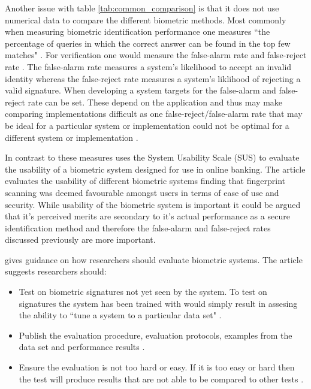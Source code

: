 \documentclass[12pt]{article}
\begin{document}
	Another issue with table \ref{tab:common_comparison} is that it does not use numerical data to compare the different biometric methods. Most commonly when measuring biometric identification performance one measures ``the percentage of queries in which the correct answer can be found in the top few matches" \citep{phillips_evaluating_biometric_systems2000}. For verification one would measure the false-alarm rate and false-reject rate \citep{phillips_evaluating_biometric_systems2000}. The false-alarm rate measures a system's likelihood to accept an invalid identity whereas the false-reject rate measures a system's liklihood of rejecting a valid signature. When developing a system targets for the false-alarm and false-reject rate can be set. These depend on the application and thus may make comparing implementations difficult as one false-reject/false-alarm rate that may be ideal for a particular system or implementation could not be optimal for a different system or implementation \citep{phillips_evaluating_biometric_systems2000}. 
	
	In contrast to these measures \cite{TASSABEHJ_Evaluating_biometrics_for_online_banking2012} uses the System Usability Scale (SUS) \citep{brooke1996sus} to evaluate the usability of a biometric system designed for use in online banking. The article evaluates the usability of different biometric systems finding that fingerprint scanning was deemed favourable amongst users in terms of ease of use and security. While usability of the biometric system is important it could be argued that it's perceived merits are secondary to it's actual performance as a secure identification method and therefore the false-alarm and false-reject rates discussed previously are more important.
	
	\cite{phillips_evaluating_biometric_systems2000} gives guidance on how researchers should evaluate biometric systems. The article suggests researchers should:
	\begin{itemize}
	    \item Test on biometric signatures not yet seen by the system. To test on signatures the system has been trained with would simply result in assesing the ability to ``tune a system to a particular data set" \citep{phillips_evaluating_biometric_systems2000}.
	    \item Publish the evaluation procedure, evaluation protocols, examples from the data set and performance results \citep{phillips_evaluating_biometric_systems2000}.
	    \item Ensure the evaluation is not too hard or easy. If it is too easy or hard then the test will produce results that are not able to be compared to other tests \citep{phillips_evaluating_biometric_systems2000}.
	\end{itemize}
	
\end{document}
